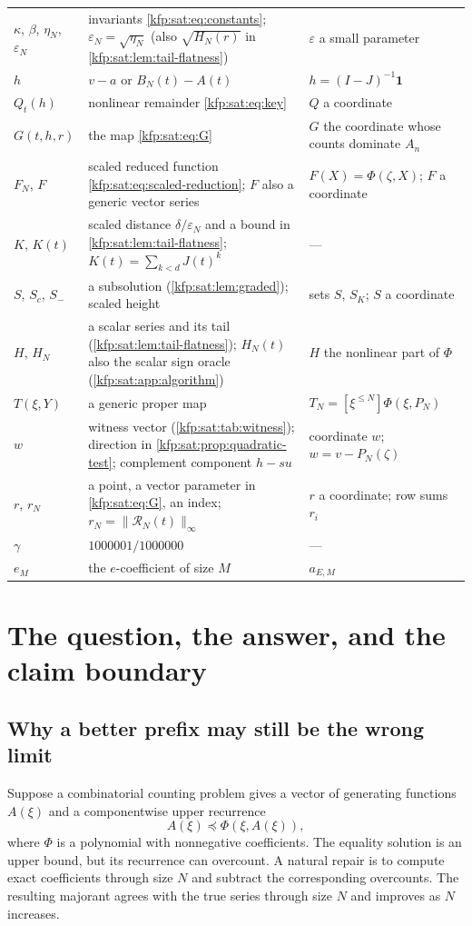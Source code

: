 \documentclass[11pt,a4paper]{article}
\theoremstyle{definition}
\theoremstyle{remark}
\newcommand{\bone}{\boldsymbol 1}
\newcommand{\strunc}[1]{[\xi^{\le #1}]}
\newcommand{\satR}{\mathcal R}
\begin{document}
\begin{longtable}{@{}>{\raggedright\arraybackslash}p{}>{\raggedright\arraybackslash}p{}>{\raggedright\arraybackslash}p{}@{}}
$\kappa$, $\beta$, $\eta_N$, $\varepsilon_N$ & invariants \eqref{kfp:sat:eq:constants}; $\varepsilon_N=\sqrt{\eta_N}$ (also $\sqrt{H_N(r)}$ in \cref{kfp:sat:lem:tail-flatness}) & $\varepsilon$ a small parameter\\
$h$ & $v-a$ or $B_N(t)-A(t)$ & $h=(I-J)^{-1}\bone$\\
$Q_t(h)$ & nonlinear remainder \eqref{kfp:sat:eq:key} & $Q$ a coordinate\\
$G(t,h,r)$ & the map \eqref{kfp:sat:eq:G} & $G$ the coordinate whose counts dominate $A_n$\\
$F_N$, $F$ & scaled reduced function \eqref{kfp:sat:eq:scaled-reduction}; $F$ also a generic vector series & $F(X)=\Phi(\zeta,X)$; $F$ a coordinate\\
$K$, $K(t)$ & scaled distance $\delta/\varepsilon_N$ and a bound in \cref{kfp:sat:lem:tail-flatness}; $K(t)=\sum_{k<d}J(t)^k$ & ---\\
$S$, $S_c$, $S_-$ & a subsolution (\cref{kfp:sat:lem:graded}); scaled height & sets $S$, $S_K$; $S$ a coordinate\\
$H$, $H_N$ & a scalar series and its tail (\cref{kfp:sat:lem:tail-flatness}); $H_N(t)$ also the scalar sign oracle (\cref{kfp:sat:app:algorithm}) & $H$ the nonlinear part of $\Phi$\\
$T(\xi,Y)$ & a generic proper map & $T_N=\strunc N\Phi(\xi,P_N)$\\
$w$ & witness vector (\cref{kfp:sat:tab:witness}); direction in \cref{kfp:sat:prop:quadratic-test}; complement component $h-su$ & coordinate $w$; $w=v-P_N(\zeta)$\\
$r$, $r_N$ & a point, a vector parameter in \eqref{kfp:sat:eq:G}, an index; $r_N=\|\satR_N(t)\|_\infty$ & $r$ a coordinate; row sums $r_i$\\
$\gamma$ & $1000001/1000000$ & ---\\
$e_M$ & the $e$-coefficient of size $M$ & $a_{E,M}$\\
\bottomrule
\end{longtable}

\section{The question, the answer, and the claim boundary}
\label{kfp:sat:sec:intro}

\subsection{Why a better prefix may still be the wrong limit}
Suppose a combinatorial counting problem gives a vector of generating
functions $A(\xi)$ and a componentwise upper recurrence
\[
 A(\xi)\preceq\Phi(\xi,A(\xi)),
\]
where $\Phi$ is a polynomial with nonnegative coefficients. The equality
solution is an upper bound, but its recurrence can overcount. A natural
repair is to compute exact coefficients through size $N$ and subtract the
corresponding overcounts. The resulting majorant agrees with the true
series through size $N$ and improves as $N$ increases.
\end{document}
